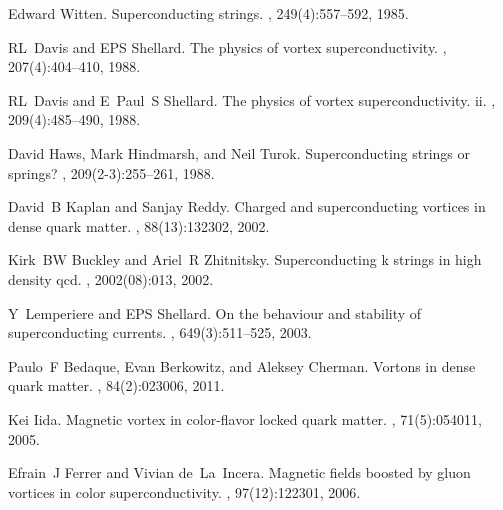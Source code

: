 \documentclass[12pt]{article}
\begin{document}
\begin{thebibliography}{99}
Edward Witten.
\newblock Superconducting strings.
, 249(4):557--592, 1985.

RL~Davis and EPS Shellard.
\newblock The physics of vortex superconductivity.
, 207(4):404--410, 1988.

RL~Davis and E~Paul~S Shellard.
\newblock The physics of vortex superconductivity. ii.
, 209(4):485--490, 1988.

David Haws, Mark Hindmarsh, and Neil Turok.
\newblock Superconducting strings or springs?
, 209(2-3):255--261, 1988.

David~B Kaplan and Sanjay Reddy.
\newblock Charged and superconducting vortices in dense quark matter.
, 88(13):132302, 2002.

Kirk~BW Buckley and Ariel~R Zhitnitsky.
\newblock Superconducting k strings in high density qcd.
, 2002(08):013, 2002.

Y~Lemperiere and EPS Shellard.
\newblock On the behaviour and stability of superconducting currents.
, 649(3):511--525, 2003.

Paulo~F Bedaque, Evan Berkowitz, and Aleksey Cherman.
\newblock Vortons in dense quark matter.
, 84(2):023006, 2011.

Kei Iida.
\newblock Magnetic vortex in color-flavor locked quark matter.
, 71(5):054011, 2005.

Efrain~J Ferrer and Vivian de~La~Incera.
\newblock Magnetic fields boosted by gluon vortices in color superconductivity.
, 97(12):122301, 2006.

\end{thebibliography}
\end{document}
